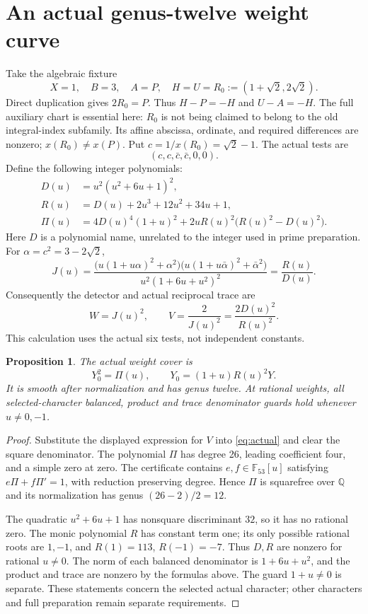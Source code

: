\documentclass[11pt,a4paper]{article}
\newtheorem{proposition}[theorem]{Proposition}
\newcommand{\Q}{\mathbb Q}\newcommand{\Z}{\mathbb Z}
\begin{document}
\section{An actual genus-twelve weight curve}
Take the algebraic fixture
\[
 X=1,\quad B=3,\quad A=P,\quad
 H=U=R_0:=(1+\sqrt2,2\sqrt2).
\]
Direct duplication gives $2R_0=P$. Thus $H-P=-H$ and $U-A=-H$.
The full auxiliary chart is essential here: $R_0$ is not being claimed
to belong to the old integral-index subfamily. Its affine abscissa,
ordinate, and required differences are nonzero; $x(R_0)\ne x(P)$.
Put $c=1/x(R_0)=\sqrt2-1$. The actual tests are
\[
                       (c,c,\bar c,\bar c,0,0).
\]
Define the following integer polynomials:
\begin{align*}
 D(u)&=u^2(u^2+6u+1)^2,\\
 R(u)&=D(u)+2u^3+12u^2+34u+1,\\
 \Pi(u)&=4D(u)^4(1+u)^2+2uR(u)^2\bigl(R(u)^2-D(u)^2\bigr).
\end{align*}
Here $D$ is a polynomial name, unrelated to the integer used in prime
preparation. For $\alpha=c^2=3-2\sqrt2$,
\[
 J(u)=\frac{\bigl(u(1+u\alpha)^2+\alpha^2\bigr)
              \bigl(u(1+u\bar\alpha)^2+\bar\alpha^2\bigr)}
             {u^2(1+6u+u^2)^2}=\frac{R(u)}{D(u)}.
\]
Consequently the detector and actual reciprocal trace are
\[
                  W=J(u)^2,\qquad V=\frac{2}{J(u)^2}
                                      =\frac{2D(u)^2}{R(u)^2}.
\]
This calculation uses the actual six tests, not independent constants.

\begin{proposition}\label{prop:small}
The actual weight cover is
\[
 Y_0^2=\Pi(u),\qquad Y_0=(1+u)R(u)^2Y.
\]
It is smooth after normalization and has genus twelve. At rational
weights, all selected-character balanced, product and trace denominator
guards hold whenever $u\ne0,-1$.
\end{proposition}
\begin{proof}
Substitute the displayed expression for $V$ into \eqref{eq:actual}
and clear the square denominator. The polynomial $\Pi$ has degree
26, leading coefficient four, and a simple zero at zero.
The certificate contains $e,f\in\mathbb F_{53}[u]$ satisfying
$e\Pi+f\Pi'=1$, with reduction preserving degree. Hence $\Pi$
is squarefree over $\Q$ and its normalization has genus $(26-2)/2=12$.

The quadratic $u^2+6u+1$ has nonsquare discriminant $32$, so it has
no rational zero. The monic polynomial $R$ has constant term one;
its only possible rational roots are $1,-1$, and
$R(1)=113$, $R(-1)=-7$. Thus $D,R$ are nonzero for rational $u\ne0$.
The norm of each balanced denominator is $1+6u+u^2$, and the product
and trace are nonzero by the formulas above. The guard $1+u\ne0$
is separate. These statements concern the selected actual character;
other characters and full preparation remain separate requirements.
\end{proof}
\end{document}

